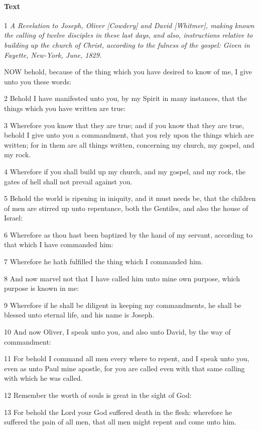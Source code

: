 			\paragraph{Text}
			
				1 \textit{A Revelation to Joseph, Oliver [Cowdery] and David [Whitmer], making known the calling of twelve disciples in these last days, and also, instructions relative to building up the church of Christ, according to the fulness of the gospel: Given in Fayette, New-York, June, 1829.}

				NOW behold, because of the thing which you have desired to know of me, I give unto you these words:

				2 Behold I have manifested unto you, by my Spirit in many instances, that the things which you have written are true:

				3 Wherefore you know that they are true; and if you know that they are true, behold I give unto you a commandment, that you rely upon the things which are written; for in them are all things written, concerning my church, my gospel, and my rock.

				4 Wherefore if you shall build up my church, and my gospel, and my rock, the gates of hell shall not prevail against you.

				5 Behold the world is ripening in iniquity, and it must needs be, that the children of men are stirred up unto repentance, both the Gentiles, and also the house of Israel:

				6 Wherefore as thou hast been baptized by the hand of my servant, according to that which I have commanded him:

				7 Wherefore he hath fulfilled the thing which I commanded him.

				8 And now marvel not that I have called him unto mine own purpose, which purpose is known in me:

				9 Wherefore if he shall be diligent in keeping my commandments, he shall be blessed unto eternal life, and his name is Joseph.

				10 And now Oliver, I speak unto you, and also unto David, by the way of commandment:

				11 For behold I command all men every where to repent, and I speak unto you, even as unto Paul mine apostle, for you are called even with that same calling with which he was called.

				12 Remember the worth of souls is great in the sight of God:

				13 For behold the Lord your God suffered death in the flesh: wherefore he suffered the pain of all men, that all men might repent and come unto him.

